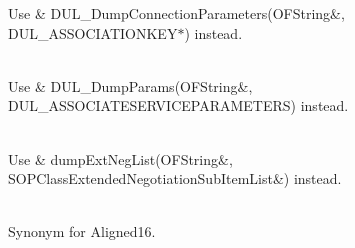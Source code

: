 \begin{DoxyRefList}
\label{deprecated__deprecated000013}%
%
Use \& DUL\+\_\+\+Dump\+Connection\+Parameters(\+OFString\&, DUL\+\_\+\+ASSOCIATIONKEY\texorpdfstring{$\ast$}{*}) instead.  
\item[{\parbox[t]{\linewidth}{Member \doxylink{dul_8h_a51de9ad61efa16139c18cd58b5de0046}{DUL\+\_\+\+Dump\+Params} (\doxylink{struct_d_u_l___a_s_s_o_c_i_a_t_e_s_e_r_v_i_c_e_p_a_r_a_m_e_t_e_r_s}{DUL\+\_\+\+ASSOCIATESERVICEPARAMETERS} \texorpdfstring{$\ast$}{*}params)}}]\hfill \\
\label{deprecated__deprecated000012}%
%
Use \& DUL\+\_\+\+Dump\+Params(\+OFString\&, DUL\+\_\+\+ASSOCIATESERVICEPARAMETERS) instead.  
\item[{\parbox[t]{\linewidth}{Member \doxylink{dul_8h_a1860dc280917317b6a0a6d674ab2090d}{dump\+Ext\+Neg\+List} (SOPClass\+Extended\+Negotiation\+Sub\+Item\+List \&lst)}}]\hfill \\
\label{deprecated__deprecated000014}%
%
Use \& dump\+Ext\+Neg\+List(\+OFString\&, SOPClass\+Extended\+Negotiation\+Sub\+Item\+List\&) instead.  
\item[{\parbox[t]{\linewidth}{Member \doxylink{group__enums_gga45fe06e29902b7a2773de05ba27b47a1ae12d0f8f869c40c76128260af2242bc8}{Eigen::\+Aligned} }}]\hfill \\
\label{deprecated__deprecated000027}%
%
Synonym for Aligned16.  
\item[{\parbox[t]{\linewidth}{Member \doxylink{group__flags_gac5795adacd266512a26890973503ed88}{Eigen::\+Aligned\+Bit} }}]\hfill \\
\label{deprecated__deprecated000026}%
%
 

\end{DoxyRefList}

